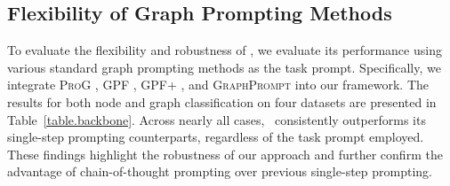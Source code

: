 \subsection{Flexibility of Graph Prompting Methods} \label{sec.backbone-flexibility}
To evaluate the flexibility and robustness of \model, we evaluate its performance using various standard graph prompting methods as the task prompt. Specifically, we integrate \textsc{ProG} \citep{sun2023all}, \textsc{GPF} \citep{fang2024universal}, \textsc{GPF+} \citep{fang2024universal}, and \textsc{GraphPrompt} \citep{liu2023graphprompt} into our framework.
The results for both node and graph classification on four datasets are presented in Table~\ref{table.backbone}. Across nearly all cases, \model\ consistently outperforms its single-step prompting counterparts, regardless of the task prompt employed. These findings highlight the robustness of our approach and further confirm the advantage of chain-of-thought prompting over previous single-step prompting.



